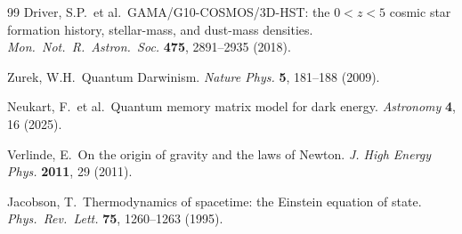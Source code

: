 \documentclass[12pt,a4paper]{article}
\begin{document}
\begin{thebibliography}{99}
Driver, S.P.\ et al.\ GAMA/G10-COSMOS/3D-HST: the $0<z<5$ cosmic star formation history, stellar-mass, and dust-mass densities. {\it Mon.\ Not.\ R.\ Astron.\ Soc.} {\bf 475}, 2891--2935 (2018).

Zurek, W.H.\ Quantum Darwinism. {\it Nature Phys.} {\bf 5}, 181--188 (2009).

Neukart, F.\ et al.\ Quantum memory matrix model for dark energy. {\it Astronomy} {\bf 4}, 16 (2025).

Verlinde, E.\ On the origin of gravity and the laws of Newton. {\it J. High Energy Phys.} {\bf 2011}, 29 (2011).

Jacobson, T.\ Thermodynamics of spacetime: the Einstein equation of state. {\it Phys.\ Rev.\ Lett.} {\bf 75}, 1260--1263 (1995).

\end{thebibliography}
\end{document}
